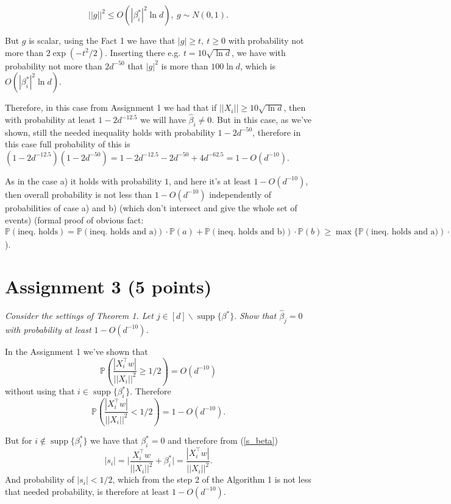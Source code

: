 \documentclass[]{article}
\DeclareMathOperator\supp{supp}
\begin{document}
$$||g||^2\le O(|\beta_i^*|^2 \ln d),\: g\sim N(0, 1).$$

But $g$ is scalar, using the Fact 1 we have that $|g| \ge t, \: t\ge 0$ with probability not more than $2\exp(-t^2/2)$. Inserting there e.g. $t=10\sqrt{\ln d}$, we have with probability not more than $2d^{-50}$ that $|g|^2$ is more than $100\ln d$, which is $O(|\beta_i^*|^2 \ln d).$

Therefore, in this case from Assignment 1 we had that if $||X_i|| \ge 10\sqrt{\ln d}$, then with probability at least $1-2d^{-12.5}$ we will have $\hat{\beta}_i \ne 0$. But in this case, as we've shown, still the needed inequality holds with probability $1-2d^{-50}$, therefore in this case full probability of this is $(1-2d^{-12.5})(1-2d^{-50}) = 1 - 2d^{-12.5} - 2d^{-50} + 4d^{-62.5} = 1 - O(d^{-10})$.

As in the case a) it holds with probability $1$, and here it's at least $1-O(d^{-10})$, then overall probability is not less than $1-O(d^{-10})$ independently of probabilities of case a) and b) (which don't intersect and give the whole set of events) (formal proof of obvious fact: $\mathbb{P}(\text{ineq. holds}) = \mathbb{P}(\text{ineq. holds and a)})\cdot\mathbb{P}(a)  + \mathbb{P}(\text{ineq. holds and b)})\cdot\mathbb{P}(b)  \ge \max\{\mathbb{P}(\text{ineq. holds and a)})\cdot\mathbb{P}(a), \mathbb{P}(\text{ineq. holds and b)})\cdot\mathbb{P}(b)\} \ge\{\text{because } \mathbb{P}(a)+\mathbb{P}(b)=1; P(a), P(b) \ge 0\} \ge \min\{1-O(d^{-10}),1\}=1-O(d^{-10})$).

\section*{Assignment 3 (5 points)}
\textit{Consider the settings of Theorem 1. Let $j\in [d]  \backslash \supp\{\beta^*\}.$ Show that $\hat{\beta}_j=0$  with probability at least $1 - O(d^{-10})$.}

In the Assignment 1 we've shown that $$\mathbb{P}\left( \frac{|X_i^\top w|}{||X_i||^2} \ge 1/2\right) = O(d^{-10})$$
without using that $i\in\supp\{\beta_i^*\}$. Therefore
$$\mathbb{P}\left( \frac{|X_i^\top w|}{||X_i||^2} < 1/2\right) = 1 - O(d^{-10}).$$

But for $i\notin \supp\{\beta_i^*\}$ we have that $\beta_i^* = 0$ and therefore from (\ref{s_beta})
$$|s_i| = \bigg\lvert\frac{X_i^\top w}{||X_i||^2} + \beta_i^*\bigg\rvert  = \frac{|X_i^\top w|}{||X_i||^2}.$$
And probability of $|s_i| < 1/2$, which from the step 2 of the Algorithm 1 is not less that needed probability, is therefore at least $1 - O(d^{-10})$.
\end{document}
